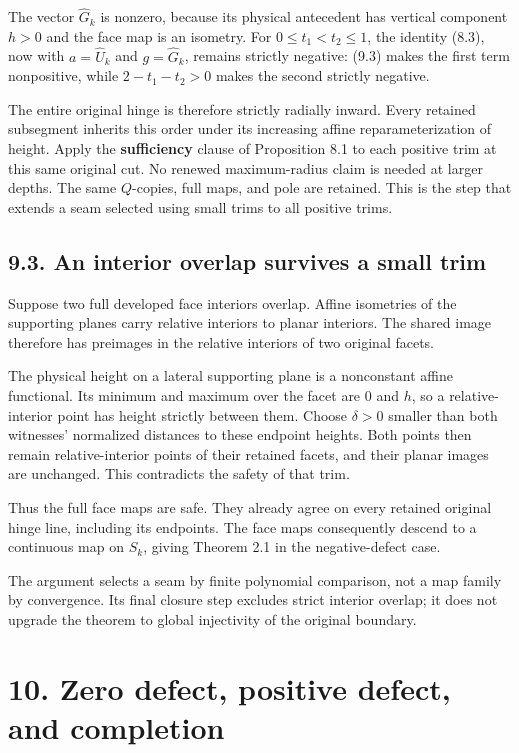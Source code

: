 \documentclass[
  11pt,
  letterpaper,
]{article}
\begin{document}
The vector \(\widehat G_k\) is nonzero, because its physical antecedent
has vertical component \(h>0\) and the face map is an isometry. For
\(0\le t_1<t_2\le1\), the identity (8.3), now with \(a=\widehat U_k\)
and \(g=\widehat G_k\), remains strictly negative: (9.3) makes the first
term nonpositive, while \(2-t_1-t_2>0\) makes the second strictly
negative.

The entire original hinge is therefore strictly radially inward. Every
retained subsegment inherits this order under its increasing affine
reparameterization of height. Apply the \textbf{sufficiency} clause of
Proposition 8.1 to each positive trim at this same original cut. No
renewed maximum-radius claim is needed at larger depths. The same
\(Q\)-copies, full maps, and pole are retained. This is the step that
extends a seam selected using small trims to all positive trims.

\subsection{9.3. An interior overlap survives a small
trim}\label{an-interior-overlap-survives-a-small-trim}

Suppose two full developed face interiors overlap. Affine isometries of
the supporting planes carry relative interiors to planar interiors. The
shared image therefore has preimages in the relative interiors of two
original facets.

The physical height on a lateral supporting plane is a nonconstant
affine functional. Its minimum and maximum over the facet are \(0\) and
\(h\), so a relative-interior point has height strictly between them.
Choose \(\delta>0\) smaller than both witnesses' normalized distances to
these endpoint heights. Both points then remain relative-interior points
of their retained facets, and their planar images are unchanged. This
contradicts the safety of that trim.

Thus the full face maps are safe. They already agree on every retained
original hinge line, including its endpoints. The face maps consequently
descend to a continuous map on \(S_k\), giving Theorem 2.1 in the
negative-defect case.

The argument selects a seam by finite polynomial comparison, not a map
family by convergence. Its final closure step excludes strict interior
overlap; it does not upgrade the theorem to global injectivity of the
original boundary.

\section{10. Zero defect, positive defect, and
completion}\label{zero-defect-positive-defect-and-completion}
\end{document}
